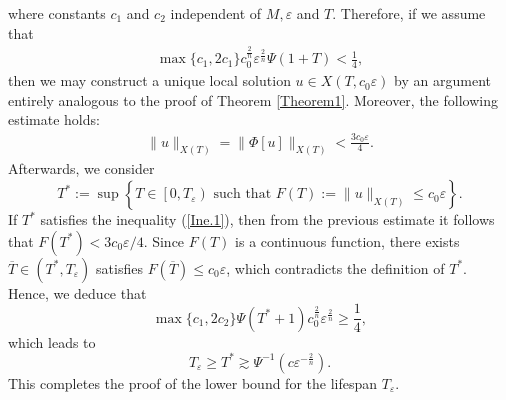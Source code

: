 \documentclass[11pt,reqno]{amsart}
\begin{document}
where constants $c_1$ and $c_2$ independent of $M, \varepsilon$ and $T$. Therefore, if we assume that
\begin{align*}
    \max\{c_1, 2c_1\} c_0^{\frac{2}{n}} \varepsilon^{\frac{2}{n}} \Psi(1+T) < \frac{1}{4},
\end{align*}
then we may construct a unique local solution $u \in X(T , c_0\varepsilon)$ by an argument entirely analogous to the proof of Theorem \ref{Theorem1}. Moreover, the following estimate
holds:
\begin{align}\label{Ine.1}
    \|u\|_{X(T)} = \|\Phi[u]\|_{X(T)} < \frac{3c_0\varepsilon}{4}.
\end{align}
Afterwards, we consider
$$
T^*:=\sup \left\{T \in\left[0, T_{\varepsilon}\right) \text { such that } F(T):=\|u\|_{X(T)} \leq c_0 \varepsilon\right\}. 
$$
If $T^*$ satisfies the inequality (\ref{Ine.1}), then from the previous estimate it follows that  $F(T^*) < 3c_0\varepsilon/4$. 
Since $F(T)$ is a continuous function, there exists $\overline{T}\in (T^*,T_{\varepsilon})$ satisfies $F(\overline{T})\leq c_0\varepsilon$, which contradicts the definition of $T^*$. Hence, we deduce that 
\[
\max\{c_1, 2c_2\}\Psi\left(T^*+1\right)c_0^{\frac{2}{n}}\varepsilon^{\frac{2}{n}}\geq \frac{1}{4},
\]
which leads to
$$
T_{\varepsilon} \geq T^* \gtrsim\Psi^{-1}\left(c\varepsilon^{-\frac{2}{n}}\right).
$$
This completes the proof of the lower bound for the lifespan $T_\varepsilon$.





\end{document}
